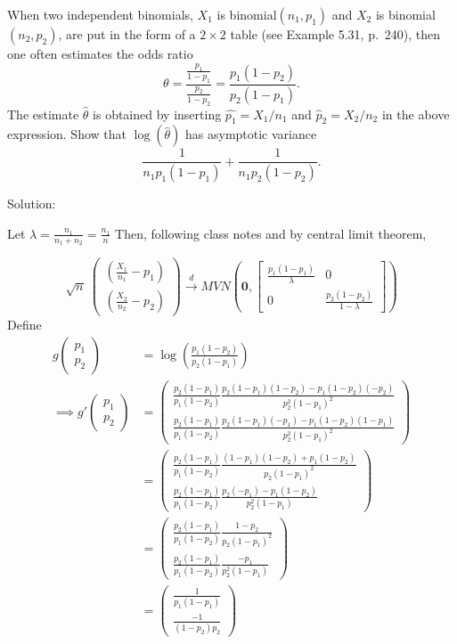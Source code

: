 \documentclass[
  letterpaper,
  DIV=11,
  numbers=noendperiod]{scrreprt}
\begin{document}
When two independent binomials, \(X_1\) is binomial\((n_1,p_1)\) and
\(X_2\) is binomial\((n_2,p_2)\), are put in the form of a \(2\times 2\)
table (see Example 5.31, p.~240), then one often estimates the odds
ratio
\[\theta = \frac{\frac{p_1}{1-p_1}}{\frac{p_2}{1-p_2}} = \frac{p_1(1-p_2)}{p_2(1-p_1)}.\]
The estimate \(\hat \theta\) is obtained by inserting
\(\hat{p_1} = X_1/n_1\) and \(\hat p_2 = X_2/n_2\) in the above
expression. Show that \(\log(\hat \theta)\) has asymptotic variance
\[\frac{1}{n_1p_1(1-p_1)}+\frac{1}{n_1p_2(1-p_2)}.\]

Solution:

Let \(\lambda = \frac{n_1}{n_1+n_2}= \frac{n_1}{n}\) Then, following
class notes and by central limit theorem,

\[
\sqrt n  \ \begin{pmatrix} \left(\frac{X_1}{n_1} - p_1 \right) \\
\left( \frac{X_2}{n_2} - p_2 \right) \end{pmatrix} \overset d \to MVN \left(\mathbf 0, \begin{bmatrix} \frac{p_1 \left(1 - p_1 \right)}{\lambda} & 0 \\
0 & \frac{p_2 \left(1 - p_2 \right)}{1-\lambda} \end{bmatrix}  \right)
\] Define \[ \begin{aligned}
g \begin{pmatrix} p_1 \\ p_2 \end{pmatrix} &= \log \left(\frac{p_1(1-p_2)}{p_2(1-p_1)}\right) \\
\implies g' \begin{pmatrix} p_1 \\ p_2 \end{pmatrix}  &= \begin{pmatrix} \frac{p_2(1-p_1)}{p_1(1-p_2)} \frac{p_2(1-p_1)(1-p_2)- p_1(1-p_2)(-p_2)}{p_2^2(1-p_1)^2} \\ \frac{p_2(1-p_1)}{p_1(1-p_2)} \frac{p_2(1-p_1)(-p_1)- p_1(1-p_2)(1-p_1)}{p_2^2(1-p_1)^2}  \end{pmatrix} \\
&=\begin{pmatrix} \frac{p_2(1-p_1)}{p_1(1-p_2)}  \frac{(1-p_1)(1-p_2)+ p_1(1-p_2)}{p_2(1-p_1)^2} \\ \frac{p_2(1-p_1)}{p_1(1-p_2)} \frac{p_2(-p_1)- p_1(1-p_2)}{p_2^2(1-p_1)}  \end{pmatrix} \\
&=\begin{pmatrix} \frac{p_2(1-p_1)}{p_1(1-p_2)} \frac{1-p_2}{p_2(1-p_1)^2} \\ \frac{p_2(1-p_1)}{p_1(1-p_2)} \frac{-p_1}{p_2^2(1-p_1)}  \end{pmatrix} \\
&=\begin{pmatrix} \frac{1}{p_1(1-p_1)} \\ \frac{-1}{(1-p_2)p_2}\end{pmatrix}
\end{aligned}\]
\end{document}
